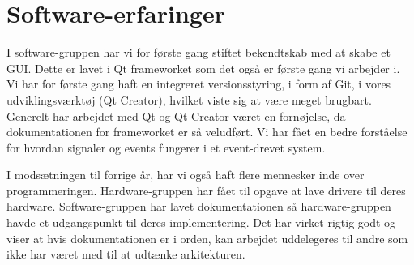 \section{Software-erfaringer}

I software-gruppen har vi for første gang stiftet bekendtskab med at skabe et GUI. Dette er lavet i Qt frameworket som det også er første gang vi arbejder i. Vi har for første gang haft en integreret versionsstyring, i form af Git, i vores udviklingsværktøj (Qt Creator), hvilket viste sig at være meget brugbart. Generelt har arbejdet med Qt og Qt Creator været en fornøjelse, da dokumentationen for frameworket er så veludført. Vi har fået en bedre forståelse for hvordan signaler og events fungerer i et event-drevet system.

I modsætningen til forrige år, har vi også haft flere mennesker inde over programmeringen. Hardware-gruppen har fået til opgave at lave drivere til deres hardware. Software-gruppen har lavet dokumentationen så hardware-gruppen havde et udgangspunkt til deres implementering. Det har virket rigtig godt og viser at hvis dokumentationen er i orden, kan arbejdet uddelegeres til andre som ikke har været med til at udtænke arkitekturen.